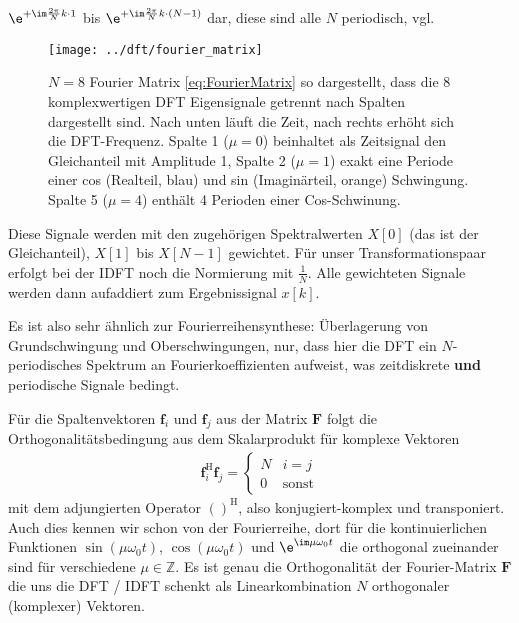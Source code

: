 $\e^{+\im\frac{2\pi}{N}k \cdot 1}$ bis $\e^{+\im\frac{2\pi}{N}k \cdot (N-1)}$
dar, diese sind alle $N$ periodisch, vgl.~
%
\begin{figure}
\centering
\texttt{[image: ../dft/fourier\_matrix]}
\caption{$N=8$ Fourier Matrix \eqref{eq:FourierMatrix} so dargestellt, dass
die 8 komplexwertigen DFT Eigensignale getrennt nach Spalten dargestellt sind.
Nach unten läuft die Zeit, nach rechts erhöht sich die DFT-Frequenz.
Spalte 1 ($\mu=0$) beinhaltet als Zeitsignal den Gleichanteil mit Amplitude 1,
Spalte 2 ($\mu=1$) exakt eine Periode einer cos (Realteil, blau) und sin (Imaginärteil, orange)
Schwingung. Spalte 5 ($\mu=4$) enthält 4 Perioden einer Cos-Schwinung.}
\label{fig:fourier_matrix}
\end{figure}


Diese Signale werden mit den zugehörigen Spektralwerten
$X[0]$ (das ist der Gleichanteil), $X[1]$ bis $X[N-1]$ gewichtet.
Für unser Transformationspaar erfolgt bei der IDFT noch die Normierung mit
$\frac{1}{N}$. Alle gewichteten Signale werden dann aufaddiert zum Ergebnissignal
$x[k]$.

Es ist also sehr ähnlich zur Fourierreihensynthese: Überlagerung von
Grundschwingung und Oberschwingungen, nur, dass hier die DFT ein $N$-periodisches
Spektrum an Fourierkoeffizienten aufweist, was zeitdiskrete \textbf{und}
periodische Signale bedingt.
%

Für die Spaltenvektoren $\bm{f}_i$ und $\bm{f}_j$ aus der Matrix $\bm{F}$
folgt die Orthogonalitätsbedingung aus dem Skalarprodukt für komplexe Vektoren
\begin{align}
\bm{f}_i^\mathrm{H} \bm{f}_j =
\begin{cases}
N & i=j\\
0 & \text{sonst}
\end{cases}
\end{align}
mit dem adjungierten Operator $()^\mathrm{H}$, also konjugiert-komplex und transponiert.
Auch dies kennen wir schon von der Fourierreihe, dort für die kontinuierlichen
Funktionen
$\sin(\mu \omega_0 t)$, $\cos(\mu \omega_0 t)$ und $\e^{\im \mu \omega_0 t}$ die
orthogonal zueinander sind für verschiedene $\mu\in\mathbb{Z}$.
%
Es ist genau die Orthogonalität der Fourier-Matrix $\bm{F}$ die uns die DFT / IDFT
schenkt als Linearkombination $N$ orthogonaler (komplexer) Vektoren.
%

